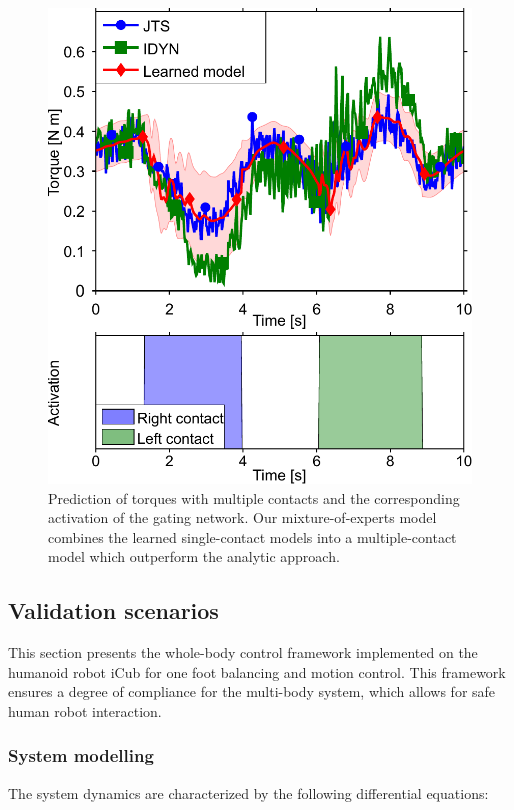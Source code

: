 \documentclass[final,5p,twocolumn]{elsarticle}
\begin{document}
\begin{figure}[t]
\begin{minipage}{.52\linewidth}
			\includegraphics[width=.89\linewidth]{images/exp3_both}
			\caption{Prediction of torques with multiple contacts and the corresponding activation of the gating network.
			Our mixture-of-experts model combines the learned single-contact models into a multiple-contact model which outperform the analytic approach.
			}
			\label{fig:exp3:gating}
		\end{minipage}	
	\end{figure}
	
\subsection{Validation scenarios}

This section presents the whole-body control framework implemented on the humanoid robot iCub for one foot balancing and motion control. This framework ensures a degree of compliance for the multi-body system, which allows for safe human robot interaction.

\subsubsection{System modelling}
The system dynamics are characterized by the following  differential equations:
\end{document}
